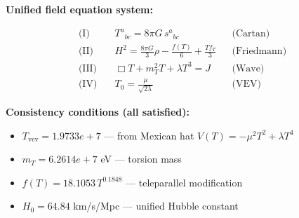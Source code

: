 
\textbf{Unified field equation system:}

\begin{align}
  \text{(I)} \quad & T^a{}_{bc} = 8\pi G \, s^a{}_{bc} && \text{(Cartan)} \\
  \text{(II)} \quad & H^2 = \frac{8\pi G}{3}\rho - \frac{f(T)}{6} + \frac{Tf_T}{3} && \text{(Friedmann)} \\
  \text{(III)} \quad & \Box T + m_T^2 T + \lambda T^3 = J && \text{(Wave)} \\
  \text{(IV)} \quad & T_0 = \frac{\mu}{\sqrt{2\lambda}} && \text{(VEV)}
\end{align}

\textbf{Consistency conditions (all satisfied):}
\begin{itemize}
  \item $T_{\text{vev}} = 1.9733e+7$ — from Mexican hat $V(T) = -\mu^2 T^2 + \lambda T^4$
  \item $m_T = 6.2614e+7$ eV — torsion mass
  \item $f(T) = 18.1053 \, T^{0.1848}$ — teleparallel modification
  \item $H_0 = 64.84$ km/s/Mpc — unified Hubble constant
\end{itemize}